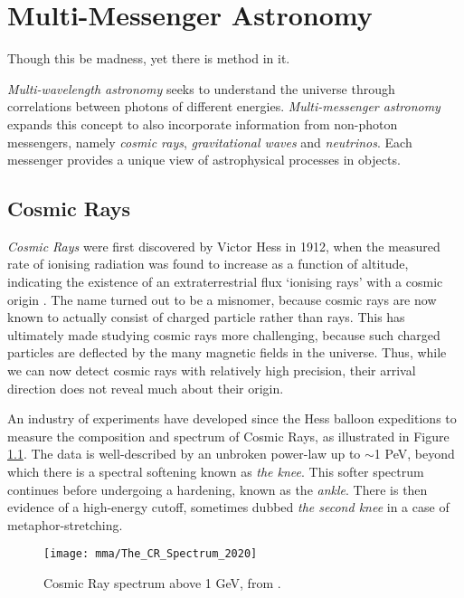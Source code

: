 \setchapterpreamble[u]{\margintoc}
\chapter{Multi-Messenger Astronomy}
\begin{fquote} Though this be madness, yet there is method in it.
\end{fquote}

\emph{Multi-wavelength astronomy} seeks to understand the universe through correlations between photons of different energies. \emph{Multi-messenger astronomy} expands this concept to also incorporate information from non-photon messengers, namely \emph{cosmic rays}, \emph{gravitational waves} and \emph{neutrinos}. Each messenger provides a unique view of astrophysical processes in objects.

\section{Cosmic Rays}

\emph{Cosmic Rays} were first discovered by Victor Hess in 1912, when the measured rate of ionising radiation was found to increase as a function of altitude, indicating the existence of an extraterrestrial flux `ionising rays' with a cosmic origin . The name turned out to be a misnomer, because cosmic rays are now known to actually consist of charged particle rather than rays. This has ultimately made studying cosmic rays more challenging, because such charged particles are deflected by the many magnetic fields in the universe. Thus, while we can now detect cosmic rays with relatively high precision, their arrival direction does not reveal much about their origin.

An industry of experiments have developed since the Hess balloon expeditions to measure the composition and spectrum of Cosmic Rays, as illustrated in Figure \ref{fig:CR_spectrum}. The data is well-described by an unbroken power-law up to $\sim$1 PeV, beyond which there is a spectral softening known as \emph{the knee}. This softer spectrum continues before undergoing a hardening, known as the \emph{ankle}. There is then evidence of a high-energy cutoff, sometimes dubbed \emph{the second knee} in a case of metaphor-stretching.

\begin{figure}
	\centering \texttt{[image: mma/The\_CR\_Spectrum\_2020]}
	\caption{Cosmic Ray spectrum above 1 GeV, from \cite{evoli_carmelo_2020_4396125}.}
	\label{fig:CR_spectrum}
\end{figure}

